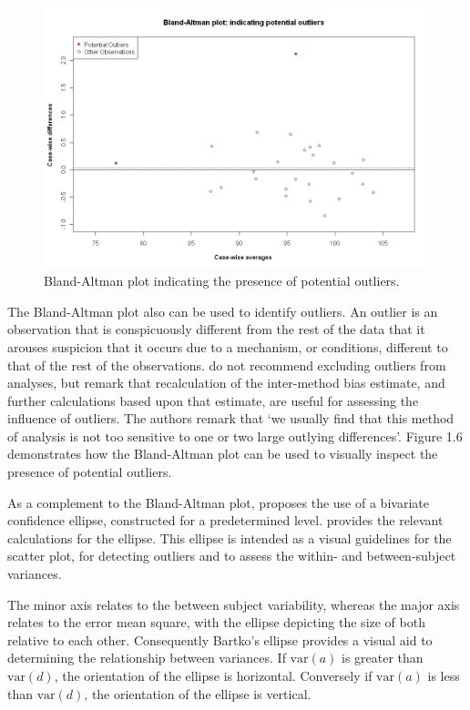 \documentclass[Main.tex]{subfiles}
\begin{document}
	\begin{figure}[h!]
		\begin{center}
			\includegraphics[width=125mm]{images/BAOutliers.jpeg}
			\caption{Bland-Altman plot indicating the presence of potential outliers.}\label{Outliers}
		\end{center}
	\end{figure}
	
	\newpage
	
	
	The Bland-Altman plot also can be used to identify outliers. An
	outlier is an observation that is conspicuously different from the
	rest of the data that it arouses suspicion that it occurs due to a
	mechanism, or conditions, different to that of the rest of the
	observations. \citet*{BA99} do not recommend excluding outliers from analyses,
	but remark that recalculation of the inter-method bias estimate,
	and further calculations based upon that estimate, are useful for
	assessing the influence of outliers. The authors remark that `we
	usually find that this method of analysis is not too sensitive to
	one or two large outlying differences'. Figure 1.6 demonstrates how the Bland-Altman
	plot can be used to visually inspect the presence of potential
	outliers.
	
	As a complement to the Bland-Altman plot, \citet{Bartko} proposes
	the use of a bivariate confidence ellipse, constructed for a
	predetermined level. \citet{AltmanEllipse} provides the relevant calculations for the
	ellipse. This ellipse is intended as a visual
	guidelines for the scatter plot, for detecting outliers and to
	assess the within- and between-subject variances.
	
	The minor axis relates to the between subject variability, whereas
	the major axis relates to the error mean square, with the ellipse
	depicting the size of both relative to each other.
	Consequently Bartko's ellipse provides a visual aid to determining the
	relationship between variances. If $\mbox{var}(a)$ is greater than $\mbox{var}(d)$, the orientation of the ellipse is horizontal. Conversely if $\mbox{var}(a)$ is less than $\mbox{var}(d)$, the orientation of the ellipse is vertical.
	
\end{document}
